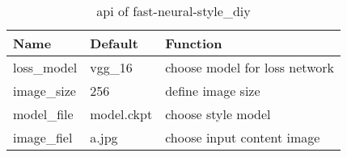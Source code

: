 \begin{table}[H]
\centering
\begin{tabular}{lll}
\toprule
  Name&Default&Function\\
\midrule
  loss\_model&vgg\_16&choose model for loss network\\
  image\_size&256&define image size \\
  model\_file&model.ckpt&choose style model\\
  image\_fiel&a.jpg&choose input content image\\
\bottomrule
\end{tabular}
\caption{api of fast-neural-style\_diy }
\label{tbl-abi-fast-neural-style}
\end{table}

